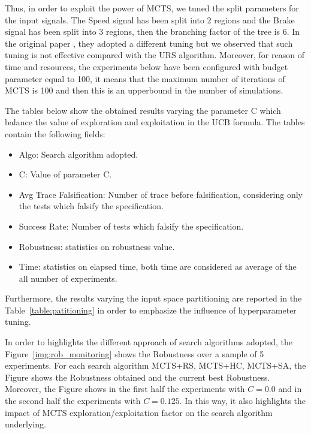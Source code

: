 \documentclass[11pt]{article}
\begin{document}
Thus, in order to exploit the power of MCTS, we tuned the split parameters for the input signals. The Speed signal has been split into 2 regions and the Brake signal has been split into 3 regions, then the branching factor of the tree is 6. In the original paper \cite{zhang2018two}, they
adopted a different tuning but we observed that such tuning is not effective compared with the URS algorithm. Moreover, for reason of time and resources, the experiments below have been configured with budget parameter equal to 100, it means that the maximum number of iterations of MCTS is 100 and then this is an upperbound in the number of simulations.

The tables below show the obtained results varying the parameter C which balance the value of exploration and exploitation in the UCB formula. The tables contain the following fields:
\begin{itemize}
    \item Algo: Search algorithm adopted.
    \item C: Value of parameter C.
    \item Avg Trace Falsification: Number of trace before falsification, considering only the tests which falsify the specification.
    \item Success Rate: Number of tests which falsify the specification.
    \item Robustness: statistics on robustness value.
    \item Time: statistics on elapsed time, both time are considered as average of the all number of experiments.
\end{itemize}

Furthermore, the results varying the input space partitioning are reported in the Table~\ref{table:patitioning} in order to emphasize the influence of hyperparameter tuning.

In order to highlights the different approach of search algorithms adopted, the Figure~\ref{img:rob_monitoring} shows the Robustness over a sample of 5 experiments. For each search algorithm MCTS+RS, MCTS+HC, MCTS+SA, the Figure shows the Robustness obtained and the current best Robustness. Moreover, the Figure shows in the first half the experiments with $C=0.0$ and in the second half the experiments with $C=0.125$. In this way, it also highlights the impact of MCTS exploration/exploitation factor on the search algorithm underlying.
\end{document}
